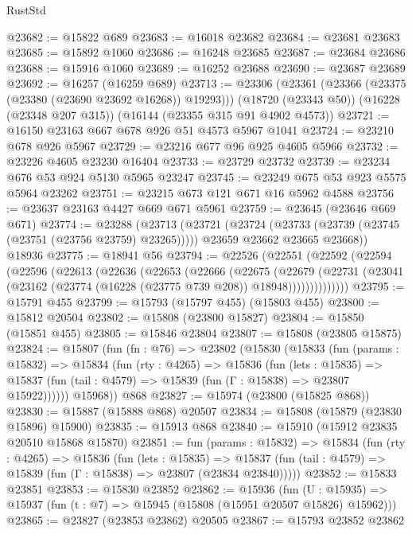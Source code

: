 \begin{lexlean}{RustStd}
\begin{coremodule}
@23682 := @15822 @689
@23683 := @16018 @23682
@23684 := @23681 @23683
@23685 := @15892 @1060
@23686 := @16248 @23685
@23687 := @23684 @23686
@23688 := @15916 @1060
@23689 := @16252 @23688
@23690 := @23687 @23689
@23692 := @16257 (@16259 @689)
@23713 := @23306
    (@23361 (@23366 (@23375 (@23380 (@23690 @23692 @16268)) @19293)))
    (@18720 (@23343 @50))
    (@16228 (@23348 @207 @315))
    (@16144 (@23355 @315 @91 @4902 @4573))
@23721 := @16150 @23163 @667 @678 @926 @51 @4573 @5967 @1041
@23724 := @23210 @678 @926 @5967
@23729 := @23216 @677 @96 @925 @4605 @5966
@23732 := @23226 @4605 @23230 @16404
@23733 := @23729 @23732
@23739 := @23234 @676 @53 @924 @5130 @5965 @23247
@23745 := @23249 @675 @53 @923 @5575 @5964 @23262
@23751 := @23215 @673 @121 @671 @16 @5962 @4588
@23756 := @23637 @23163 @4427 @669 @671 @5961
@23759 := @23645 (@23646 @669 @671)
@23774 := @23288
    (@23713
      (@23721
        (@23724 (@23733 (@23739 (@23745 (@23751 (@23756 @23759) @23265)))))
        @23659
        @23662
        @23665
        @23668))
    @18936
@23775 := @18941 @56
@23794 := @22526
    (@22551
      (@22592
        (@22594
          (@22596
            (@22613
              (@22636
                (@22653
                  (@22666
                    (@22675
                      (@22679
                        (@22731
                          (@23041 (@23162 (@23774 (@16228 (@23775 @739 @208)) @18948))))))))))))))
@23795 := @15791 @455
@23799 := @15793 (@15797 @455) (@15803 @455)
@23800 := @15812 @20504
@23802 := @15808 (@23800 @15827)
@23804 := @15850 (@15851 @455)
@23805 := @15846 @23804
@23807 := @15808 (@23805 @15875)
@23824 := @15807
    (fun (fn : @76) =>
    @23802
      (@15830
        (@15833
          (fun (params : @15832) =>
          @15834
            (fun (rty : @4265) =>
            @15836
              (fun (lets : @15835) =>
              @15837 (fun (tail : @4579) => @15839 (fun (Γ : @15838) => @23807 @15922))))))
        @15968))
    @868
@23827 := @15974 (@23800 (@15825 @868))
@23830 := @15887 (@15888 @868) @20507
@23834 := @15808 (@15879 (@23830 @15896) @15900)
@23835 := @15913 @868
@23840 := @15910 (@15912 @23835 @20510 @15868 @15870)
@23851 := fun (params : @15832) =>
  @15834
    (fun (rty : @4265) =>
    @15836
      (fun (lets : @15835) =>
      @15837 (fun (tail : @4579) => @15839 (fun (Γ : @15838) => @23807 (@23834 @23840)))))
@23852 := @15833 @23851
@23853 := @15830 @23852
@23862 := @15936
    (fun (U : @15935) => @15937 (fun (t : @7) => @15945 (@15808 (@15951 @20507 @15826) @15962)))
@23865 := @23827 (@23853 @23862) @20505
@23867 := @15793 @23852 @23862

\end{coremodule}
\end{lexlean}
